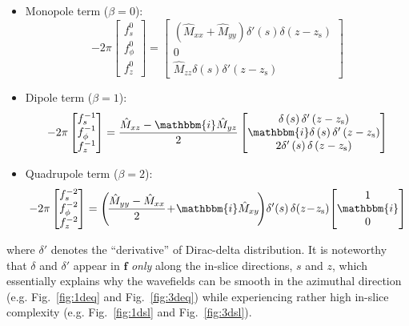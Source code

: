\documentclass[extra]{gji}
\begin{document}
\begin{itemize}
  \item Monopole term ($\beta=0$):
  \begin{equation} 
    -2\pi 
    \begin{bmatrix}
      f_s^0\\f_\phi^0\\f_z^0
    \end{bmatrix}
    =
    \begin{bmatrix}
      \left(\hat{M}_{xx}+\hat{M}_{yy}\right)\delta'\left(s\right)\delta\left(z-z_\text{s}\right)\\
      0\\
      \hat{M}_{zz}\delta\left(s\right)\delta'\left(z-z_\text{s}\right)
    \end{bmatrix}
    \label{eq:fmono}
  \end{equation}
  \item Dipole term ($\beta=1$):
  \begin{equation} 
    -2\pi 
    \begin{bmatrix}
      f_s^{-1}\\f_\phi^{-1}\\f_z^{-1}
    \end{bmatrix}
    =
    \frac{\hat{M}_{xz}-\mathbbm{i}\hat{M}_{yz}}{2}
    \begin{bmatrix}
      \delta\left(s\right)\delta'\left(z-z_\text{s}\right)\\
      \mathbbm{i}\delta\left(s\right)\delta'\left(z-z_\text{s}\right)\\
      2\delta'\left(s\right)\delta\left(z-z_\text{s}\right)
    \end{bmatrix}
    \label{eq:fdi}
  \end{equation}
  \item Quadrupole term ($\beta=2$):
  \begin{equation} 
    -2\pi 
    \begin{bmatrix}
       f_s^{-2}\\f_\phi^{-2}\\f_z^{-2}
    \end{bmatrix}
    =
    \left(\!\frac{\hat{M}_{yy}-\hat{M}_{xx}}{2}\!+\!\mathbbm{i}\hat{M}_{xy}\!\right)
    \!\delta'\!\left(s\right) \delta\!\left(z\!-\!z_\text{s}\right)
    \!\begin{bmatrix}
      1\\\mathbbm{i}\\0
    \end{bmatrix}
    \label{eq:fquad}
  \end{equation}
\end{itemize}
where $\delta'$ denotes the ``derivative'' of Dirac-delta distribution. 
It is noteworthy that $\delta$ and $\delta'$ appear in $\mathbf{f}$ 
\textit{only} along the in-slice directions, $s$ and $z$, 
which essentially explains why the wavefields can be smooth in the 
azimuthal direction (e.g. Fig.~\ref{fig:1deq} and Fig.~\ref{fig:3deq})
while experiencing rather high in-slice complexity
(e.g. Fig.~\ref{fig:1dsl} and Fig.~\ref{fig:3dsl}). 
\end{document}

